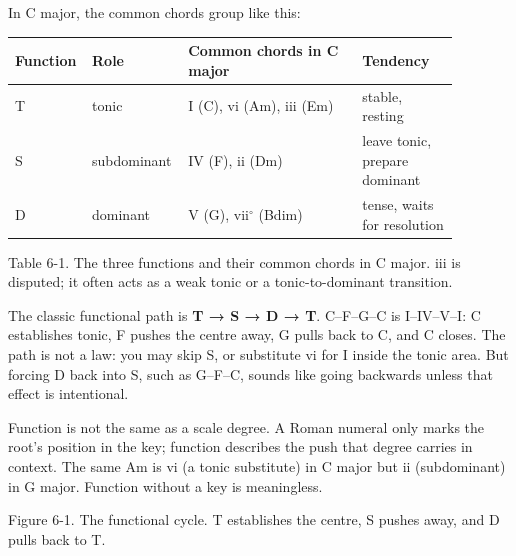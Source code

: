 In C major, the common chords group like this:

\begin{center}
\small
\begin{tabular}{p{0.10\linewidth}p{0.19\linewidth}p{0.38\linewidth}p{0.21\linewidth}}
\toprule
Function & Role & Common chords in C major & Tendency \\
\midrule
T & tonic & I (C), vi (Am), iii (Em) & stable, resting \\
S & subdominant & IV (F), ii (Dm) & leave tonic, prepare dominant \\
D & dominant & V (G), vii$^\circ$ (Bdim) & tense, waits for resolution \\
\bottomrule
\end{tabular}

Table 6-1. The three functions and their common chords in C major. iii is disputed; it often acts as a weak tonic or a tonic-to-dominant transition.
\end{center}

The classic functional path is \textbf{T → S → D → T}. C--F--G--C is I--IV--V--I: C establishes tonic, F pushes the centre away, G pulls back to C, and C closes. The path is not a law: you may skip S, or substitute vi for I inside the tonic area. But forcing D back into S, such as G--F--C, sounds like going backwards unless that effect is intentional.

Function is not the same as a scale degree. A Roman numeral only marks the root's position in the key; function describes the push that degree carries in context. The same Am is vi (a tonic substitute) in C major but ii (subdominant) in G major. Function without a key is meaningless.

\begin{center}
\begin{minipage}{0.82\linewidth}
\centering
{}

Figure 6-1. The functional cycle. T establishes the centre, S pushes away, and D pulls back to T.
\end{minipage}
\end{center}

